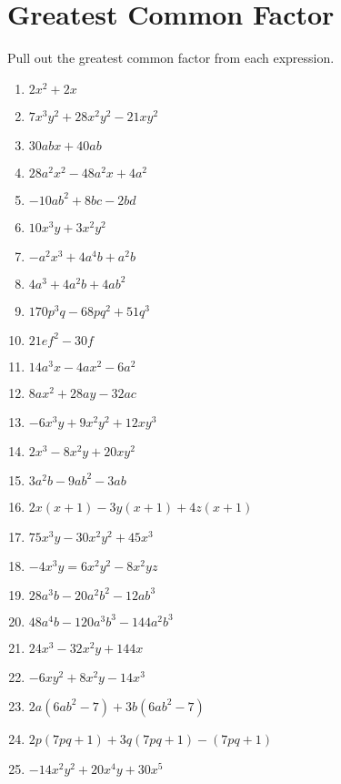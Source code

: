 \documentclass{article}
\begin{document}
\section{Greatest Common Factor}
Pull out the greatest common factor from each expression. \\
\begin{enumerate}
\item $2x^{2} + 2x$
\item $7x^{3}y^{2} + 28x^{2}y^{2} - 21xy^{2}$
\item $30abx + 40ab$
\item $28a^{2}x^{2} - 48a^{2}x + 4a^{2}$
\item $-10ab^{2} + 8bc - 2bd$
\item $10x^{3}y + 3x^{2}y^{2}$
\item $-a^{2}x^{3} + 4a^{4}b + a^{2}b$
\item $4a^{3} + 4a^{2}b + 4ab^{2}$
\item $170p^{3}q - 68pq^{2} + 51q^{3}$
\item $21ef^{2} - 30f$
\item $14a^{3}x - 4ax^{2} - 6a^{2}$
\item $8ax^{2} + 28ay - 32ac$
\item $-6x^{3}y + 9x^{2}y^{2} + 12xy^{3}$
\item $2x^{3} - 8x^{2}y + 20xy^{2}$
\item $3a^{2}b - 9ab^{2} - 3ab$
\item $2x(x+1) - 3y(x+1) + 4z(x+1)$
\item $75x^{3}y - 30x^{2}y^{2} + 45x^{3}$
\item $-4x^{3}y = 6x^{2}y^{2} - 8x^{2}yz$
\item $28a^{3}b - 20a^{2}b^{2} - 12ab^{3}$
\item $48a^{4}b - 120a^{3}b^{3} - 144a^{2}b^{3}$
\item $24x^{3} - 32x^{2}y + 144x$
\item $-6xy^{2} + 8x^{2}y - 14x^{3}$
\item $2a(6ab^{2}-7) + 3b(6ab^{2}-7)$
\item $2p(7pq+1) + 3q(7pq+1) - (7pq+1)$
\item $-14x^{2}y^{2} + 20x^{4}y + 30x^{5}$
\end{enumerate}
\end{document}
